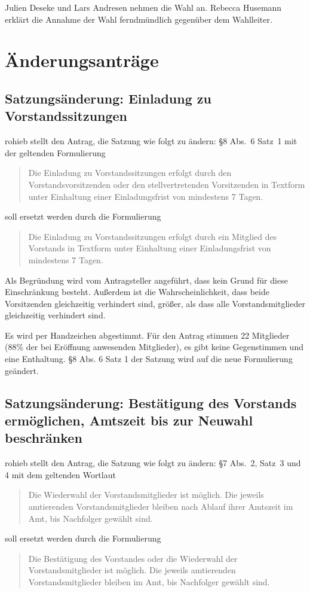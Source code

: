 \documentclass[a4paper,12pt]{scrartcl}
\begin{document}
Julien Deseke und Lars Andresen nehmen die Wahl an. Rebecca Husemann erklärt die
Annahme der Wahl ferndmündlich gegenüber dem Wahlleiter.

\section{Änderungsanträge}

\subsection{Satzungsänderung: Einladung zu Vorstandssitzungen}

rohieb stellt den Antrag, die Satzung wie folgt zu ändern: §8 Abs.~6 Satz~1 mit
der geltenden Formulierung
\begin{quote}
  Die Einladung zu Vorstandssitzungen erfolgt durch den Vorstandsvorsitzenden
  oder den stellvertretenden Vorsitzenden in Textform unter Einhaltung einer
  Einladungsfrist von mindestens 7 Tagen.
\end{quote}
soll ersetzt werden durch die Formulierung
\begin{quote}
  Die Einladung zu Vorstandssitzungen erfolgt durch ein Mitglied des Vorstands
  in Textform unter Einhaltung einer Einladungsfrist von mindestens 7 Tagen.
\end{quote}

Als Begründung wird vom Antragsteller angeführt, dass kein Grund für diese
Einschränkung besteht. Außerdem ist die Wahrscheinlichkeit, dass beide
Vorsitzenden gleichzeitig verhindert sind, größer, als dass alle
Vorstandsmitglieder gleichzeitig verhindert sind.

Es wird per Handzeichen abgestimmt. Für den Antrag stimmen 22 Mitglieder (88\%
der bei Eröffnung anwesenden Mitglieder), es gibt keine Gegenstimmen und eine
Enthaltung. §8 Abs. 6 Satz 1 der Satzung wird auf die neue Formulierung
geändert.

\subsection{Satzungsänderung: Bestätigung des Vorstands ermöglichen, Amtszeit
bis zur Neuwahl beschränken}

rohieb stellt den Antrag, die Satzung wie folgt zu ändern: §7 Abs.~2, Satz~3 und
4 mit dem geltenden Wortlaut
\begin{quote}
  Die Wiederwahl der Vorstandsmitglieder ist möglich. Die jeweils amtierenden
  Vorstandsmitglieder bleiben nach Ablauf ihrer Amtszeit im Amt, bis Nachfolger
  gewählt sind.
\end{quote}
soll ersetzt werden durch die Formulierung
\begin{quote}
  Die Bestätigung des Vorstandes oder die Wiederwahl der Vorstandsmitglieder ist
  möglich. Die jeweils amtierenden Vorstandsmitglieder bleiben im Amt, bis
  Nachfolger gewählt sind.
\end{quote}
\end{document}
